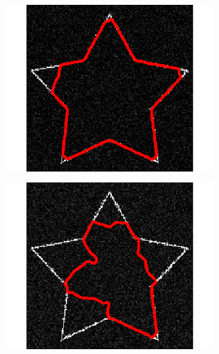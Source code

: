 \begin{figure}[H]
\centering
\begin{subfigure}[c]{0.3\linewidth}
\centering
\includegraphics[width=\textwidth]{Chapters/Images/Noise/vfcg1}
\caption{}
\end{subfigure}
\begin{subfigure}[c]{0.3\linewidth}
\centering
\includegraphics[width=\textwidth]{Chapters/Images/Noise/vfcg5}
\caption{}
\end{subfigure}
\\
\begin{subfigure}[c]{0.3\linewidth}
\centering

\end{subfigure}
\end{figure}
